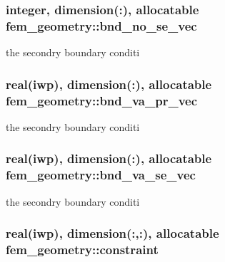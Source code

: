 \subsubsection[{bnd\+\_\+no\+\_\+se\+\_\+vec}]{\setlength{\rightskip}{0pt plus 5cm}integer, dimension(\+:), allocatable fem\+\_\+geometry\+::bnd\+\_\+no\+\_\+se\+\_\+vec}\label{classfem__geometry_acf0254abaafe358f825a34f402babb1f}


the secondry boundary conditi 

\hypertarget{classfem__geometry_a5cf400a0df2f2bbcab52dbfa3918af3a}{}
\subsubsection[{bnd\+\_\+va\+\_\+pr\+\_\+vec}]{\setlength{\rightskip}{0pt plus 5cm}real(iwp), dimension(\+:), allocatable fem\+\_\+geometry\+::bnd\+\_\+va\+\_\+pr\+\_\+vec}\label{classfem__geometry_a5cf400a0df2f2bbcab52dbfa3918af3a}


the secondry boundary conditi 

\hypertarget{classfem__geometry_a0add746ed85a4361e704a080e0ee5040}{}
\subsubsection[{bnd\+\_\+va\+\_\+se\+\_\+vec}]{\setlength{\rightskip}{0pt plus 5cm}real(iwp), dimension(\+:), allocatable fem\+\_\+geometry\+::bnd\+\_\+va\+\_\+se\+\_\+vec}\label{classfem__geometry_a0add746ed85a4361e704a080e0ee5040}


the secondry boundary conditi 

\hypertarget{classfem__geometry_ab72001505f174b162826371649bb9562}{}
\subsubsection[{constraint}]{\setlength{\rightskip}{0pt plus 5cm}real(iwp), dimension(\+:,\+:), allocatable fem\+\_\+geometry\+::constraint}\label{classfem__geometry_ab72001505f174b162826371649bb9562}
\hypertarget{classfem__geometry_ad74fb946f3d6ddc2d5c295614927ef99}{}
